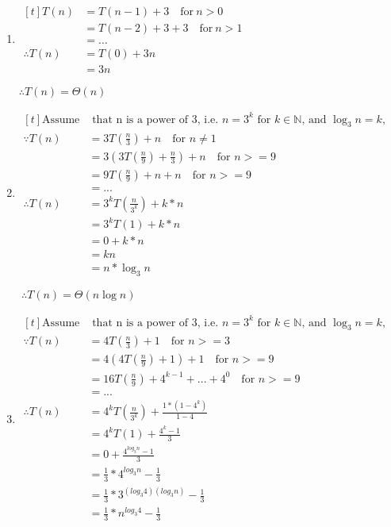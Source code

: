 \documentclass{article}
\begin{document}
\begin{enumerate}[label=(\alph*)]
\item $\begin{aligned}[t]
T(n) &= T(n - 1) + 3 \quad \text{for}\ n > 0\\
&= T(n - 2) + 3 + 3 \quad \text{for}\ n > 1\\
&= \dots \\
\therefore T(n) &= T(0) + 3n\\
&= 3n
\end{aligned}$

$
\therefore T(n) = \Theta(n)$

\item $\begin{aligned}[t]
\text{Assume} & \text{ that n is a power of 3, i.e. $n=3^k$ for $k \in \mathbb{N}$, and $\log_3 n = k$,}\\
\because T(n) &= 3T(\frac{n}{3}) + n \quad \text{for $n\neq1$}\\
&= 3(3T(\frac{n}{9}) + \frac{n}{3}) + n \quad \text{for $n>=9$}\\
&= 9T(\frac{n}{9}) + n + n \quad \text{for $n>=9$}\\
&= ...&\\
\therefore T(n) &= 3^kT(\frac{n}{3^k}) + k*n \\
&= 3^kT(1) + k*n\\
&= 0 + k*n\\
&= kn\\
&= n * \log_3 n
\end{aligned}$

$\ \therefore T(n) = \Theta(n \log n)$

\item $\begin{aligned}[t]
\text{Assume} & \text{ that n is a power of 3, i.e. $n=3^k$ for $k \in \mathbb{N}$, and $\log_3 n = k$,}\\
\because T(n) &= 4T(\frac{n}{3})+1 \quad \text{for $n>=3$}\\
&= 4(4T(\frac{n}{9}) + 1) + 1 \quad \text{for $n>=9$}\\
&= 16T(\frac{n}{9}) + 4^{k-1} + ... + 4^0 \quad \text{for $n>=9$}\\
&= ...\\
\therefore T(n) &= 4^kT(\frac{n}{3^k}) + \frac{1*(1-4^k)}{1-4} \\
&= 4^kT(1) + \frac{4^k-1}{3} \\
&= 0 + \frac{4^{log_3 n}-1}{3} \\
&= \frac{1}{3} * 4^{log_3 n} - \frac{1}{3} \\
&= \frac{1}{3} * 3^{(log_3 4)(log_3 n)} - \frac{1}{3} \\
&= \frac{1}{3} * n^{log_3 4} - \frac{1}{3} \\
\end{aligned}$


\end{enumerate}
\end{document}
